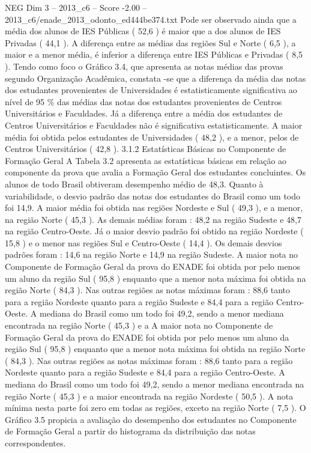 \begin{textsample}{NEG Dim 3 – 2013\_c6 – Score -2.00 – 2013\_c6/enade\_2013\_odonto\_ed444be374.txt}
Pode ser observado ainda que a média dos alunos de IES Públicas ( 52,6 ) é maior que a dos alunos de IES Privadas ( 44,1 ).
A diferença entre as médias das regiões Sul e Norte ( 6,5 ), a maior e a menor média, é inferior a diferença entre IES Públicas e Privadas ( 8,5 ).
Tendo como foco o Gráfico 3.4, que apresenta as notas médias das provas segundo Organização Acadêmica, constata -se que a diferença da média das notas dos estudantes provenientes de Universidades é estatisticamente significativa ao nível de 95 \% das médias das notas dos estudantes provenientes de Centros Universitários e Faculdades.
Já a diferença entre a média dos estudantes de Centros Universitários e Faculdades não é significativa estatisticamente.
A maior média foi obtida pelos estudantes de Universidades ( 48,2 ), e a menor, pelos de Centros Universitários ( 42,8 ). 3.1.2 Estatísticas Básicas no Componente de Formação Geral A Tabela 3.2 apresenta as estatísticas básicas em relação ao componente da prova que avalia a Formação Geral dos estudantes concluintes.
Os alunos de todo Brasil obtiveram desempenho médio de 48,3.
Quanto à variabilidade, o desvio padrão das notas dos estudantes do Brasil como um todo foi 14,9.
A maior média foi obtida nas regiões Nordeste e Sul ( 49,3 ), e a menor, na região Norte ( 45,3 ).
As demais médias foram : 48,2 na região Sudeste e 48,7 na região Centro-Oeste.
Já o maior desvio padrão foi obtido na região Nordeste ( 15,8 ) e o menor nas regiões Sul e Centro-Oeste ( 14,4 ).
Os demais desvios padrões foram : 14,6 na região Norte e 14,9 na região Sudeste.
A maior nota no Componente de Formação Geral da prova do ENADE foi obtida por pelo menos um aluno da região Sul ( 95,8 ) enquanto que a menor nota máxima foi obtida na região Norte ( 84,3 ).
Nas outras regiões as notas máximas foram : 88,6 tanto para a região Nordeste quanto para a região Sudeste e 84,4 para a região Centro-Oeste.
A mediana do Brasil como um todo foi 49,2, sendo a menor mediana encontrada na região Norte ( 45,3 ) e a A maior nota no Componente de Formação Geral da prova do ENADE foi obtida por pelo menos um aluno da região Sul ( 95,8 ) enquanto que a menor nota máxima foi obtida na região Norte ( 84,3 ).
Nas outras regiões as notas máximas foram : 88,6 tanto para a região Nordeste quanto para a região Sudeste e 84,4 para a região Centro-Oeste.
A mediana do Brasil como um todo foi 49,2, sendo a menor mediana encontrada na região Norte ( 45,3 ) e a maior encontrada na região Nordeste ( 50,5 ).
A nota mínima nesta parte foi zero em todas as regiões, exceto na região Norte ( 7,5 ).
O Gráfico 3.5 propicia a avaliação do desempenho dos estudantes no Componente de Formação Geral a partir do histograma da distribuição das notas correspondentes.

\end{textsample}
